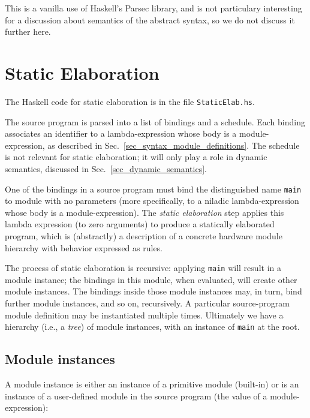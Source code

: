 \documentclass[11pt]{article}
\newcommand{\term}[1]{\texttt{#1}}
\begin{document}
This is a vanilla use of Haskell's Parsec library, and is not
particulary interesting for a discussion about semantics of the
abstract syntax, so we do not discuss it further here.


\section{Static Elaboration}

\label{sec_static_elaboration}

The Haskell code for static elaboration is in the file \term{StaticElab.hs}.

The source program is parsed into a list of bindings and a schedule.
Each binding associates an identifier to a lambda-expression whose
body is a module-expression, as described in
Sec.~\ref{sec_syntax_module_definitions}.  The schedule is not
relevant for static elaboration; it will only play a role in dynamic
semantics, discussed in Sec.~\ref{sec_dynamic_semantics}.

One of the bindings in a source program must bind the distinguished
name \term{main} to module with no parameters (more specifically, to a
niladic lambda-expression whose body is a module-expression).  The
\emph{static elaboration} step applies this lambda expression (to zero
arguments) to produce a statically elaborated program, which is
(abstractly) a description of a concrete hardware module hierarchy
with behavior expressed as rules.

The process of static elaboration is recursive: applying \term{main}
will result in a module instance; the bindings in this module, when
evaluated, will create other module instances.  The bindings inside
those module instances may, in turn, bind further module instances,
and so on, recursively.  A particular source-program module definition
may be instantiated multiple times.  Ultimately we have a hierarchy
(i.e., a \emph{tree}) of module instances, with an instance of
\term{main} at the root.


\subsection{Module instances}

A module instance is either an instance of a primitive module
(built-in) or is an instance of a user-defined module in the source
program (the value of a module-expression):
\end{document}
